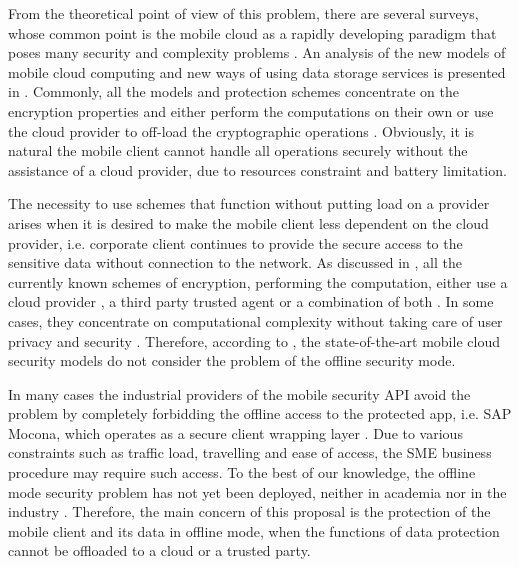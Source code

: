 \documentclass[twocolumn]{svjour3}          	%
\begin{document}
From the theoretical point of view of this problem, there are several surveys, whose common point is the mobile cloud as a rapidly developing paradigm that poses many security and complexity problems \cite{yovel2014, khan2015cloud, khan2014survey, khan2013towards}. An analysis of the new models of mobile cloud computing and new ways of using data storage services is presented in \cite{khan2015cloud, khan2013towards}. Commonly, all the models and protection schemes concentrate on the encryption properties and either perform the computations on their own \cite{zhao2010trusted, yang2011provable} or use the cloud provider to off-load the cryptographic operations \cite{itani2010energy, ren2011lightweight}. Obviously, it is natural the mobile client cannot handle all operations securely without the assistance of a cloud provider, due to resources constraint and battery limitation.

The necessity to use schemes that function without putting load on a provider arises when it is desired to make the mobile client less dependent on the cloud provider, i.e. corporate client continues to provide the secure access to the sensitive data without connection to the network. As discussed in \cite{khan2015cloud}, all the currently known schemes of encryption, performing the computation, either use a cloud provider \cite{zhao2010trusted}, a third party trusted agent \cite{yang2011provable} or a combination of both \cite{itani2010energy}. In some cases, they concentrate on computational complexity without taking care of user privacy and security \cite{ren2011lightweight}.
Therefore, according to \cite{khan2015cloud, tenorio2013greatest, khan2013towards}, the state-of-the-art mobile cloud security models do not consider the problem of the offline security mode. 

In many cases the industrial providers of the mobile security API avoid the problem by completely forbidding the offline access to the protected app, i.e. SAP Mocona, which operates as a secure client wrapping layer \cite{Lelyveld2013}. Due to various constraints such as traffic load, travelling and ease of access, the SME business procedure may require such access. To the best of our knowledge, the offline mode security problem has not yet been deployed, neither in academia nor in the industry \cite{yovel2014, khan2015cloud, khan2014survey, khan2013towards}. Therefore, the main concern of this proposal is the protection of the mobile client and its data in offline mode, when the functions of data protection cannot be offloaded to a cloud or a trusted party. 
\end{document}
